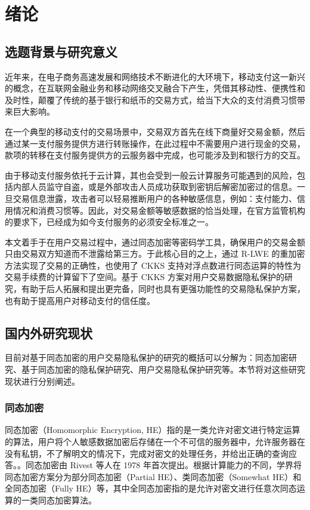 \chapter{绪论}

\section{选题背景与研究意义}
近年来，在电子商务高速发展和网络技术不断进化的大环境下，移动支付这一新兴的概念，在互联网金融业务和移动网络交叉融合下产生，凭借其移动性、便携性和及时性，颠覆了传统的基于银行和纸币的交易方式，给当下大众的支付消费习惯带来巨大影响。\cite{mobilepaymentrisk}

在一个典型的移动支付的交易场景中，交易双方首先在线下商量好交易金额，然后通过某一支付服务提供方进行转账操作，在此过程中不需要用户进行现金的交易，款项的转移在支付服务提供方的云服务器中完成，也可能涉及到和银行方的交互。

由于移动支付服务依托于云计算，其也会受到一般云计算服务可能遇到的风险，包括内部人员监守自盗，或是外部攻击人员成功获取到密钥后解密加密过的信息\cite{lastpass}。一旦交易信息泄露，攻击者可以轻易推断用户的各种敏感信息，例如：支付能力、信用情况和消费习惯等。因此，对交易金额等敏感数据的恰当处理，在官方监管机构的要求下，已经成为如今支付服务的必须安全标准之一。\cite{gov_pay}

本文着手于在用户交易过程中，通过同态加密等密码学工具，确保用户的交易金额只由交易双方知道而不泄露给第三方。于此核心目的之上，通过 R-LWE 的重加密方法\cite{Mouchet2020LattigoAM,lattigoRepo}实现了交易的正确性，也使用了 CKKS 支持对浮点数进行同态运算的特性为交易手续费的计算留下了空间。基于 CKKS 方案对用户交易数据隐私保护的研究，有助于后人拓展和提出更完备，同时也具有更强功能性的交易隐私保护方案，也有助于提高用户对移动支付的信任度。

\section{国内外研究现状}

目前对基于同态加密的用户交易隐私保护的研究的概括可以分解为：同态加密研究、基于同态加密的隐私保护研究、用户交易隐私保护研究等。本节将对这些研究现状进行分别阐述。

\subsection{同态加密}

同态加密（Homomorphic Encryption, HE）指的是一类允许对密文进行特定运算的算法，用户将个人敏感数据加密后存储在一个不可信的服务器中，允许服务器在没有私钥，不了解明文的情况下，完成对密文的处理任务，并给出正确的查询应答。\cite{FHEResearch}。同态加密由 Rivest 等人在 1978 年首次提出\cite{rivest1978data}。根据计算能力的不同，学界将同态加密方案分为部分同态加密（Partial HE）、类同态加密（Somewhat HE）和全同态加密（Fully HE）等，其中全同态加密指的是允许对密文进行任意次同态运算的一类同态加密算法。


